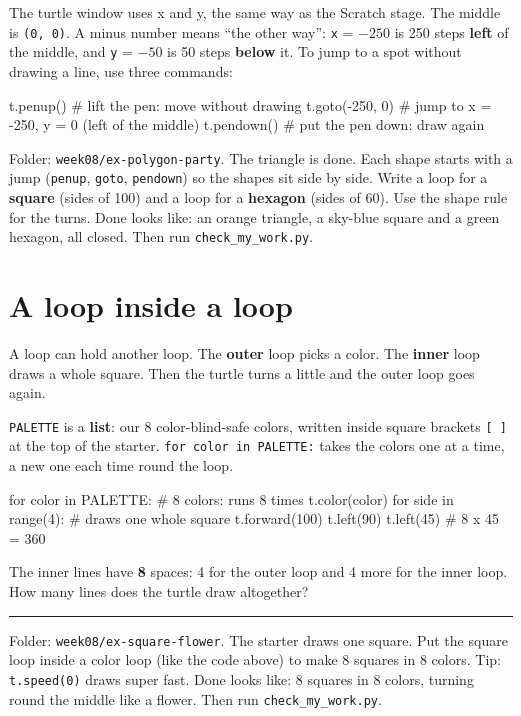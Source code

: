 \begin{tip}
The turtle window uses x and y, the same way as the Scratch stage. The middle is \texttt{(0, 0)}. A minus number means \enquote{the other way}: \texttt{x} = $-250$ is 250 steps \textbf{left} of the middle, and \texttt{y} = $-50$ is 50 steps \textbf{below} it. To jump to a spot without drawing a line, use three commands:
\begin{pycode}
t.penup()           # lift the pen: move without drawing
t.goto(-250, 0)     # jump to x = -250, y = 0 (left of the middle)
t.pendown()         # put the pen down: draw again
\end{pycode}
\end{tip}

\begin{exercise}
Folder: \texttt{week08/ex-polygon-party}. The triangle is done. Each shape starts with a jump (\texttt{penup}, \texttt{goto}, \texttt{pendown}) so the shapes sit side by side. Write a loop for a \textbf{square} (sides of 100) and a loop for a \textbf{hexagon} (sides of 60). Use the shape rule for the turns.
Done looks like: an orange triangle, a sky-blue square and a green hexagon, all closed. Then run \texttt{check\_my\_work.py}.
\end{exercise}

\section{A loop inside a loop}
A loop can hold another loop. The \textbf{outer} loop picks a color. The \textbf{inner} loop draws a whole square. Then the turtle turns a little and the outer loop goes again.

\texttt{PALETTE} is a \textbf{list}: our 8 color-blind-safe colors, written inside square brackets \texttt{[ ]} at the top of the starter. \texttt{for color in PALETTE:} takes the colors one at a time, a new one each time round the loop.
\begin{pycode}
for color in PALETTE:          # 8 colors: runs 8 times
    t.color(color)
    for side in range(4):       # draws one whole square
        t.forward(100)
        t.left(90)
    t.left(45)                  # 8 x 45 = 360
\end{pycode}
The inner lines have \textbf{8} spaces: 4 for the outer loop and 4 more for the inner loop. How many lines does the turtle draw altogether? \rule{1.5cm}{0.4pt}

\begin{exercise}
Folder: \texttt{week08/ex-square-flower}. The starter draws one square. Put the square loop inside a color loop (like the code above) to make 8 squares in 8 colors. Tip: \texttt{t.speed(0)} draws super fast.
Done looks like: 8 squares in 8 colors, turning round the middle like a flower. Then run \texttt{check\_my\_work.py}.
\end{exercise}

